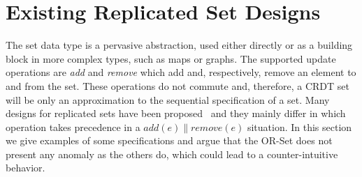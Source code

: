 \section{Existing Replicated Set Designs}
\label{sec:existing_sets}

The set data type is a pervasive abstraction, used either directly or as a
building block in more complex types, such as maps or graphs. The supported
update operations are \textit{add} and \textit{remove} which add and,
respectively, remove an element to and from the set. These operations do not
commute and, therefore, a CRDT set will be only an approximation to the
sequential specification of a set. Many designs for replicated sets have been
proposed~\cite{shapiro:inria-00555588} and they mainly differ in which operation
takes precedence in a $\textit{add}(e) \parallel \textit{remove}(e)$ situation.
In this section we give examples of some specifications and argue that the
OR-Set does not present any anomaly as the others do, which could lead to a
counter-intuitive behavior.

